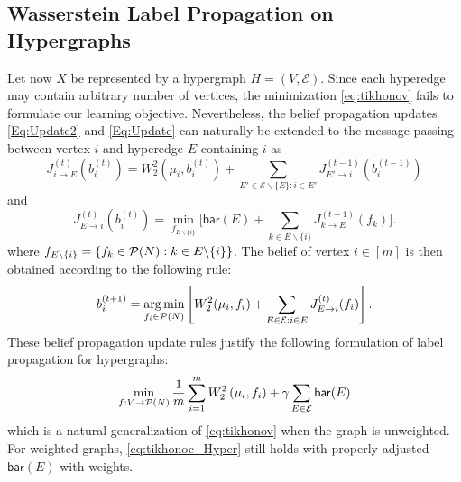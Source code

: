 \documentclass[letterpaper]{article} %
\begin{document}
\subsection{Wasserstein Label Propagation on Hypergraphs}
Let now $X$ be represented by a hypergraph $H=(V, \mathcal E)$. Since each hyperedge may contain arbitrary number of vertices, the minimization \eqref{eq:tikhonov} fails to formulate our learning objective. Nevertheless, the belief propagation updates \eqref{Eq:Update2} and \eqref{Eq:Update} can naturally be extended to the message passing between vertex $i$ and hyperedge $E$ containing $i$ as 
\begin{equation}\label{Eq:Update_H_2}
J^{(t)}_{i\to E} \left(b_i^{(t)}\right) =W_2^2\left(\mu_i, b_i^{(t)}\right) +\!\!\!\!\!\!\sum_{E'\in \mathcal E\backslash\{E\}:i\in E'}J^{(t-1)}_{E'\to i}\left(b_i^{(t-1)}\right)
\end{equation}
and 
\begin{equation}\label{Eq:Update_H}
    J^{(t)}_{E\to i}\left(b_i^{(t)}\right) =  \min_{f_{E\backslash \{i\}}}\Big[\mathsf{bar}(E) + \sum_{k\in E\backslash \{i\}}J^{(t-1)}_{k\to E}(f_k)\Big].
\end{equation}
where  $f_{E\backslash \{i\}}=\{f_k\in\P(N): k\in E\backslash\{i\}\}$.
The belief of vertex $i\in [m]$ is then obtained according to the following rule:
$$b_i^{(t+1)}=\argmin_{f_i\in \P(N)}\left[W_2^2(\mu_i, f_i) + \sum_{E\in \mathcal{E}:i\in E}J^{(t)}_{E\to i}(f_i)\right].$$
These belief propagation update rules justify the following formulation of label propagation for hypergraphs:
\begin{equation}\label{eq:tikhonoc_Hyper}
    \min_{f:V\to \P(N)} \frac{1}{m}\sum_{i=1}^m W_2^2\left(\mu_i, f_i\right) + \gamma\sum_{E\in \mathcal E}\mathsf{bar}(E)
\end{equation}
which is a natural generalization of \eqref{eq:tikhonov} when the graph is unweighted. For weighted graphs, \eqref{eq:tikhonoc_Hyper} still holds with properly adjusted $\mathsf{bar}(E)$ with weights.
\end{document}
